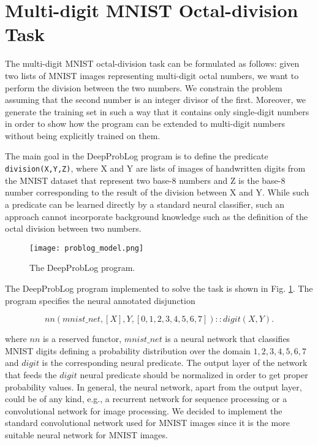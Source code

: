 \section{Multi-digit MNIST Octal-division Task}
\label{sec:task}

The multi-digit MNIST octal-division task can be formulated as follows: given two lists of MNIST images representing multi-digit octal numbers, we want to perform the division between the two numbers. We constrain the problem assuming that the second number is an integer divisor of the first. Moreover, we generate the training set in such a way that it contains only single-digit numbers in order to show how the program can be extended to multi-digit numbers without being explicitly trained on them.

The main goal in the DeepProbLog program is to define the predicate \texttt{division(X,Y,Z)}, where X and Y are lists of images of handwritten digits from the MNIST dataset that represent two base-8 numbers and Z is the base-8 number corresponding to the result of the division between X and Y. While such a predicate can be learned directly by a standard neural classifier, such an approach cannot incorporate background knowledge such as the definition of the octal division between two numbers.

\begin{figure}[ht]
\centerline{\texttt{[image: problog\_model.png]}}
\caption{The DeepProbLog program.}
\label{fig:program}
\end{figure}

The DeepProbLog program implemented to solve the task is shown in Fig. \ref{fig:program}. The program specifies the neural annotated disjunction

\begin{equation}
    nn(mnist\_net,[X],Y,[0,1,2,3,4,5,6,7]) :: digit(X,Y).
\end{equation}

where $nn$ is a reserved functor, $mnist\_net$ is a neural network that classifies MNIST digits defining a probability distribution over the domain ${1,2,3,4,5,6,7}$ 
and $digit$ is the corresponding neural predicate. The output layer of the network that feeds the $digit$ neural predicate should be normalized in order to get proper probability values. In general, the neural network, apart from the output layer, could be of any kind, e.g., a recurrent network for sequence processing or a convolutional network for image processing. We decided to implement the standard convolutional network used for MNIST images since it is the more suitable neural network for MNIST images. %

